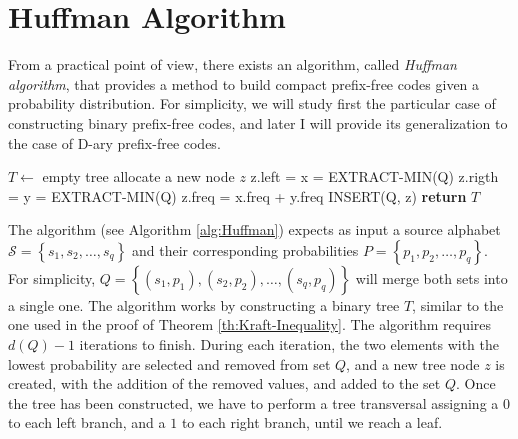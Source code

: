 %
%

\section{Huffman Algorithm}
\label{sec:Huffman-Algorithm}

From a practical point of view, there exists an algorithm, called \emph{Huffman algorithm}, that provides a method to build compact prefix-free codes given a probability distribution. For simplicity, we will study first the particular case of constructing binary prefix-free codes, and later I will provide its generalization to the case of D-ary prefix-free codes.

\begin{algorithm}
\caption{Huffman Algorithm}
\label{alg:Huffman}
\begin{algorithmic}
    \State $T \gets$ empty tree
        \State allocate a new node $z$
        \State z.left = x = EXTRACT-MIN(Q)
        \State z.rigth = y = EXTRACT-MIN(Q)
        \State z.freq = x.freq + y.freq
        \State INSERT(Q, z)
    \EndFor
    \State \textbf{return} $T$
\EndProcedure
\end{algorithmic}
\end{algorithm}

The algorithm (see Algorithm \ref{alg:Huffman}) expects as input a source alphabet $\mathcal{S}=\left\{ s_{1},s_{2},\ldots,s_{q}\right\}$ and their corresponding probabilities $P = \left\{ p_{1}, p_{2}, \ldots, p_{q} \right\}$. For simplicity, $Q = \left\{ (s_{1}, p_{1}), (s_{2}, p_{2}), \ldots, (s_{q}, p_{q}) \right\}$ will merge both sets into a single one. The algorithm works by constructing a binary tree $T$, similar to the one used in the proof of Theorem \ref{th:Kraft-Inequality}. The algorithm requires $d(Q) - 1$ iterations to finish. During each iteration, the two elements with the lowest probability are selected and removed from set $Q$, and a new tree node $z$ is created, with the addition of the removed values, and added to the set $Q$. Once the tree has been constructed, we have to perform a tree transversal assigning a $0$ to each left branch, and a $1$ to each right branch, until we reach a leaf.

